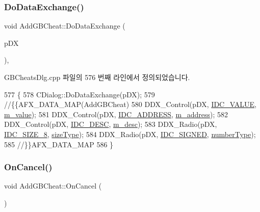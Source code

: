 \subsubsection{\texorpdfstring{Do\+Data\+Exchange()}{DoDataExchange()}}
{\footnotesize\ttfamily void Add\+G\+B\+Cheat\+::\+Do\+Data\+Exchange (\begin{DoxyParamCaption}\item[{C\+Data\+Exchange $\ast$}]{p\+DX }\end{DoxyParamCaption})\hspace{0.3cm}{\ttfamily [protected]}, {\ttfamily [virtual]}}



G\+B\+Cheats\+Dlg.\+cpp 파일의 576 번째 라인에서 정의되었습니다.


\begin{DoxyCode}
577 \{
578   CDialog::DoDataExchange(pDX);
579   \textcolor{comment}{//\{\{AFX\_DATA\_MAP(AddGBCheat)}
580   DDX\_Control(pDX, \mbox{\hyperlink{resource_8h_aa862eefddc803e8e65c3253b8029314f}{IDC\_VALUE}}, \mbox{\hyperlink{class_add_g_b_cheat_ac5705ad3d8964adb59d62c51dd60a0fc}{m\_value}});
581   DDX\_Control(pDX, \mbox{\hyperlink{resource_8h_af0726d27cf7b7070867a81fde283a218}{IDC\_ADDRESS}}, \mbox{\hyperlink{class_add_g_b_cheat_af68f821a3073c6a01f1c8760dab628ee}{m\_address}});
582   DDX\_Control(pDX, \mbox{\hyperlink{resource_8h_adb05cf1e74135587a9b3ab93a5152feb}{IDC\_DESC}}, \mbox{\hyperlink{class_add_g_b_cheat_ae1711f59505d7d442a6572a346993cd2}{m\_desc}});
583   DDX\_Radio(pDX, \mbox{\hyperlink{resource_8h_aabec7e8ec4648288db9ff8c10fdf3bb7}{IDC\_SIZE\_8}}, \mbox{\hyperlink{class_add_g_b_cheat_ae0603ce2570d5b09a64f4bd6c2107962}{sizeType}});
584   DDX\_Radio(pDX, \mbox{\hyperlink{resource_8h_ae13e01a62e7c40be0e3a93d98d2cd1d3}{IDC\_SIGNED}}, \mbox{\hyperlink{class_add_g_b_cheat_ab49fa34156026418e26edf606aa82b1a}{numberType}});
585   \textcolor{comment}{//\}\}AFX\_DATA\_MAP}
586 \}
\end{DoxyCode}
\mbox{\label{class_add_g_b_cheat_ac2eb6674e040b6a8af227e6517f857e8}} 
\subsubsection{\texorpdfstring{On\+Cancel()}{OnCancel()}}
{\footnotesize\ttfamily void Add\+G\+B\+Cheat\+::\+On\+Cancel (\begin{DoxyParamCaption}{ }\end{DoxyParamCaption})\hspace{0.3cm}{\ttfamily [protected]}}



